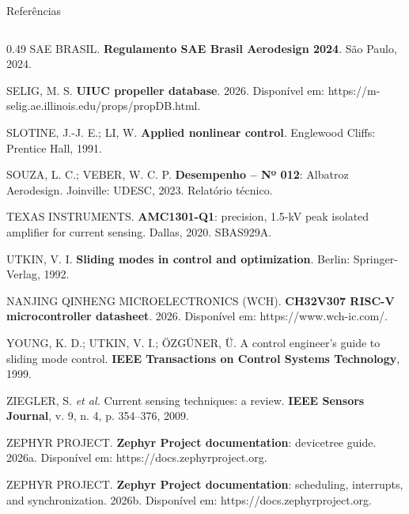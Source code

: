 \begin{frame}{Referências}
\begin{columns}[t]
\begin{column}{0.49\textwidth}
      SAE BRASIL. \textbf{Regulamento SAE Brasil Aerodesign 2024}. São
      Paulo, 2024.

      SELIG, M. S. \textbf{UIUC propeller database}. 2026. Disponível em:
      https://m-selig.ae.illinois.edu/props/propDB.html.

      SLOTINE, J.-J. E.; LI, W. \textbf{Applied nonlinear control}.
      Englewood Cliffs: Prentice Hall, 1991.

      SOUZA, L. C.; VEBER, W. C. P. \textbf{Desempenho -- Nº 012}:
      Albatroz Aerodesign. Joinville: UDESC, 2023. Relatório técnico.

      TEXAS INSTRUMENTS. \textbf{AMC1301-Q1}: precision, 1.5-kV peak isolated
      amplifier for current sensing. Dallas, 2020. SBAS929A.

      UTKIN, V. I. \textbf{Sliding modes in control and optimization}.
      Berlin: Springer-Verlag, 1992.

      NANJING QINHENG MICROELECTRONICS (WCH). \textbf{CH32V307 RISC-V
      microcontroller datasheet}. 2026. Disponível em: https://www.wch-ic.com/.

      YOUNG, K. D.; UTKIN, V. I.; ÖZGÜNER, Ü. A control engineer's guide to
      sliding mode control. \textbf{IEEE Transactions on Control Systems
      Technology}, 1999.

      ZIEGLER, S. \textit{et al.} Current sensing techniques: a review.
      \textbf{IEEE Sensors Journal}, v. 9, n. 4, p. 354--376, 2009.

      ZEPHYR PROJECT. \textbf{Zephyr Project documentation}: devicetree
      guide. 2026a. Disponível em: https://docs.zephyrproject.org.

      ZEPHYR PROJECT. \textbf{Zephyr Project documentation}: scheduling,
      interrupts, and synchronization. 2026b. Disponível em:
      https://docs.zephyrproject.org.
    \end{column}
  \end{columns}
\end{frame}
